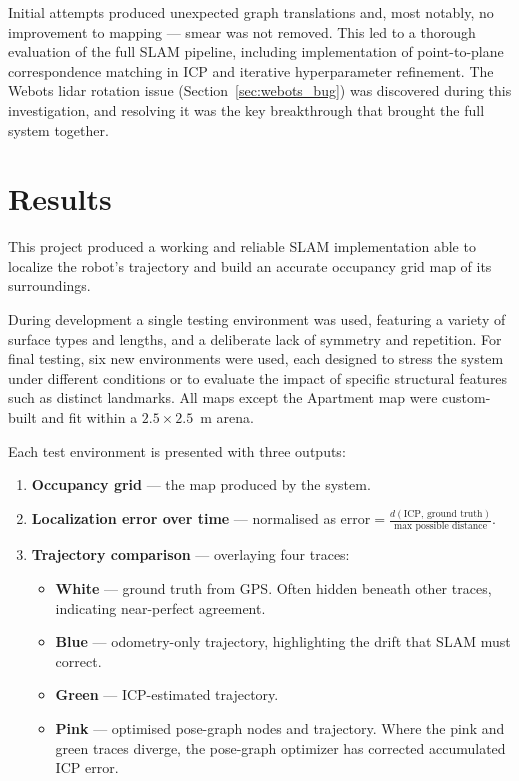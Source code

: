 \documentclass[12pt]{report}
\begin{document}
Initial attempts produced unexpected graph translations and, most notably, no improvement to
mapping --- smear was not removed.
This led to a thorough evaluation of the full SLAM pipeline, including implementation of
point-to-plane correspondence matching in ICP and iterative hyperparameter refinement.
The Webots lidar rotation issue (Section~\ref{sec:webots_bug}) was discovered during this
investigation, and resolving it was the key breakthrough that brought the full system together.

\chapter{Results}

This project produced a working and reliable SLAM implementation able to localize the robot's
trajectory and build an accurate occupancy grid map of its surroundings.

During development a single testing environment was used, featuring a variety of surface types and
lengths, and a deliberate lack of symmetry and repetition.
For final testing, six new environments were used, each designed to stress the system under
different conditions or to evaluate the impact of specific structural features such as distinct
landmarks.
All maps except the Apartment map were custom-built and fit within a $2.5 \times 2.5$~m arena.

Each test environment is presented with three outputs:
\begin{enumerate}
    \item \textbf{Occupancy grid} --- the map produced by the system.
    \item \textbf{Localization error over time} --- normalised as
          $\text{error} = \tfrac{d(\text{ICP},\,\text{ground truth})}{\text{max possible distance}}$.
    \item \textbf{Trajectory comparison} --- overlaying four traces:
          \begin{itemize}
              \item \textbf{White} --- ground truth from GPS.
                    Often hidden beneath other traces, indicating near-perfect agreement.
              \item \textbf{Blue} --- odometry-only trajectory, highlighting the drift that SLAM must correct.
              \item \textbf{Green} --- ICP-estimated trajectory.
              \item \textbf{Pink} --- optimised pose-graph nodes and trajectory.
                    Where the pink and green traces diverge, the pose-graph optimizer has corrected
                    accumulated ICP error.
          \end{itemize}
\end{enumerate}
\end{document}
